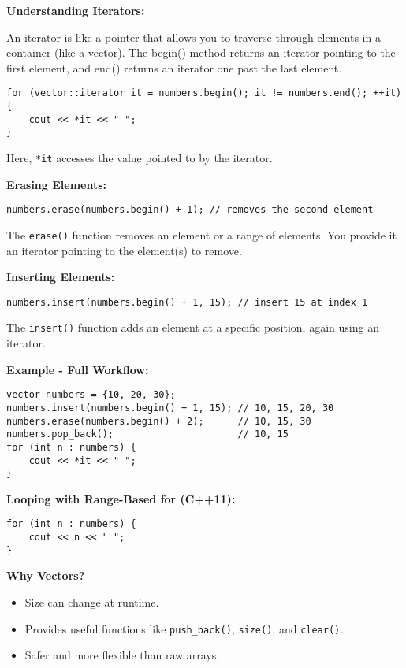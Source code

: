 \documentclass{article}
\begin{document}
\textbf{Understanding Iterators:}

An iterator is like a pointer that allows you to traverse through elements in a container (like a vector). The begin() method returns an iterator pointing to the first element, and end() returns an iterator one past the last element.

\begin{lstlisting}[style=cppstyle]
for (vector::iterator it = numbers.begin(); it != numbers.end(); ++it) {
    cout << *it << " ";
}
\end{lstlisting}

Here, \texttt{*it} accesses the value pointed to by the iterator.

\textbf{Erasing Elements:}
\begin{lstlisting}[style=cppstyle]
numbers.erase(numbers.begin() + 1); // removes the second element
\end{lstlisting}
The \texttt{erase()} function removes an element or a range of elements. You provide it an iterator pointing to the element(s) to remove.

\textbf{Inserting Elements:}
\begin{lstlisting}[style=cppstyle]
numbers.insert(numbers.begin() + 1, 15); // insert 15 at index 1
\end{lstlisting}
The \texttt{insert()} function adds an element at a specific position, again using an iterator.

\textbf{Example - Full Workflow:}
\begin{lstlisting}[style=cppstyle]
vector numbers = {10, 20, 30};
numbers.insert(numbers.begin() + 1, 15); // 10, 15, 20, 30
numbers.erase(numbers.begin() + 2);      // 10, 15, 30
numbers.pop_back();                      // 10, 15
for (int n : numbers) {
    cout << *it << " ";
}
\end{lstlisting}
\textbf{Looping with Range-Based for (C++11):}
\begin{lstlisting}[style=cppstyle]
for (int n : numbers) {
    cout << n << " ";
}
\end{lstlisting}

\textbf{Why Vectors?}
\begin{itemize}
    \item Size can change at runtime.
    \item Provides useful functions like \texttt{push\_back()}, \texttt{size()}, and \texttt{clear()}.
    \item Safer and more flexible than raw arrays.
\end{itemize}
\end{document}
